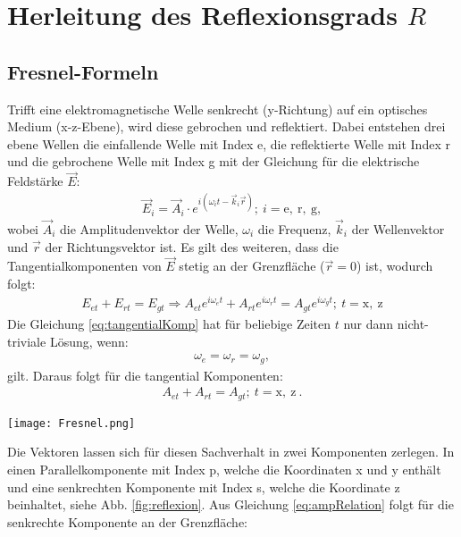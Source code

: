
\newpage
\section{Herleitung des Reflexionsgrads $R$}
\label{sec:reflexionsgrad}

\subsection{Fresnel-Formeln}
\label{sub:fresnel}
Trifft eine elektromagnetische Welle senkrecht (y-Richtung) auf ein optisches Medium (x-z-Ebene), wird diese gebrochen und reflektiert. Dabei entstehen drei ebene Wellen die einfallende Welle mit Index e, die reflektierte Welle  mit Index r und die gebrochene Welle mit Index g mit der Gleichung für die elektrische Feldstärke $\vec{E}$:
\begin{gather}
	\vec{E}_i = \vec{A}_i \cdot e^{i(\omega_i t - \vec{k}_i\vec{r})};~i = \mathrm{e,~r,~g},
	\label{eq:efeld}
\end{gather}
wobei $\vec{A}_i$ die Amplitudenvektor der Welle, $\omega_i$ die Frequenz, $\vec{k}_i$ der Wellenvektor und $\vec{r}$ der Richtungsvektor ist. Es gilt des weiteren, dass die Tangentialkomponenten von $\vec{E}$ stetig an der Grenzfläche ($\vec{r} = 0$) ist, wodurch folgt:
\begin{gather}
	E_{et} + E_{rt} = E_{gt} \Rightarrow A_{et} e^{i\omega_e t} + A_{rt} e^{i\omega_r t} = A_{gt} e^{i\omega_g t};~t = \mathrm{x,~z}
	\label{eq:tangentialKomp}
\end{gather} 
Die Gleichung \ref{eq:tangentialKomp} hat für beliebige Zeiten $t$ nur dann nicht-triviale Lösung, wenn:
\begin{gather}
	\omega_e = \omega_r = \omega_g,
	\label{eq:frequenzRelation}
\end{gather}
gilt. Daraus folgt für die tangential Komponenten:
\begin{gather}
	A_{et} + A_{rt} = A_{gt};~t = \mathrm{x,~z}~.
	\label{eq:ampRelation}
\end{gather}
\begin{center}
	\captionsetup{type=figure}
	\texttt{[image: Fresnel.png]}
	\label{fig:reflexion}
\end{center}
Die Vektoren lassen sich für diesen Sachverhalt in zwei Komponenten zerlegen. In einen Parallelkomponente mit Index p, welche die Koordinaten x und y enthält und eine senkrechten Komponente mit Index s, welche die Koordinate z beinhaltet, siehe Abb. \ref{fig:reflexion}. Aus Gleichung \ref{eq:ampRelation} folgt für die senkrechte Komponente an der Grenzfläche:

